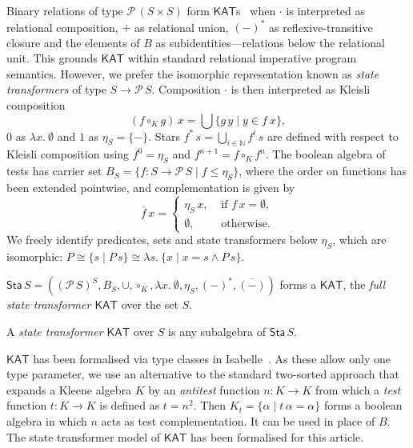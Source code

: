 \documentclass[envcountsame,envcountsect]{llncs}
\newcommand{\KAT}{\mathsf{KAT}}
\newcommand{\Pow}{\mathcal{P}}
\newcommand{\sta}{\mathsf{Sta}}
\begin{document}
Binary relations of type $\Pow\, (S\times S)$ form
$\KAT$s~\cite{Kozen97} when $\cdot$ is interpreted as
relational composition, $+$ as relational union, $(-)^\ast$
as reflexive-transitive closure and the elements of $B$ as
subidentities---relations below the relational unit. This
grounds $\KAT$ within standard relational imperative program
semantics. However, we prefer the isomorphic representation known
as \emph{state transformers} of type $S\to \Pow\, S$.
Composition $\cdot$ is then interpreted as Kleisli
composition
\begin{equation*} 
(f\circ_K g)\, x = \bigcup\{g\, y\mid y \in f\ x \}, 
\end{equation*} 
$0$ as $\lambda x.\ \emptyset$ and $1$ as $\eta_S = \{-\}$.  Stars
$f^{\ast}\, s  = \bigcup_{i\in\mathbb{N}} f^i\, s$ are defined with
  respect to Kleisli composition using $f^{0} = \eta_S$ and
  $f^{n+1} = f \circ_K f^{n}$. The boolean algebra of tests has
  carrier set $B_S=\{f:S\to \Pow\, S \mid f\le \eta_S\}$, where the
  order on functions has been extended pointwise,  and complementation
  is given by
  \begin{equation*} 
    \overline{f}\, x =
  \begin{cases}
    \eta_S\, x, & \text{ if } f\, x = \emptyset,\\
\emptyset, & \text{ otherwise}.
  \end{cases}
\end{equation*}
We freely identify predicates, sets and state 
transformers below $\eta_S$, which are isomorphic:
$P\cong \{s\mid P\, s\}\cong \lambda s.\ \{x\mid x=s \land P\, s\}$.

\begin{proposition}\label{P:kleisli-ka}
$\sta\, S = ((\Pow\, S)^S,B_S,\cup,\circ_K,\lambda x.\
  \emptyset, \eta_S,(-)^{\ast},\overline{(-)})$
  forms a $\KAT$, the \emph{full state transformer $\KAT$} over the
  set $S$.
\end{proposition}
A \emph{state transformer $\KAT$} over $S$ is any subalgebra of
$\sta\, S$. 

$\KAT$ has been formalised via type classes in
Isabelle~\cite{afp:kat}.  As these allow only one type parameter, we
use an alternative to the standard two-sorted approach that expands a
Kleene algebra $K$ by an \emph{antitest} function $n:K\to K$ from
which a \emph{test} function $t:K\to K$ is defined as $t=n^2$. Then
$K_t = \{\alpha \mid t\, \alpha = \alpha\}$ forms a boolean algebra in
which $n$ acts as test complementation. It can be used in place of
$B$.  The state transformer model of $\KAT$ has been formalised for
this article.
\end{document}
